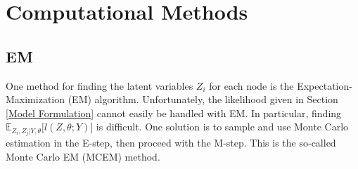 \documentclass{article}
\begin{document}


\section{Computational Methods} \label{Computational Methods}

\subsection{EM}

One method for finding the latent variables $Z_i$ for each node is the Expectation-Maximization (EM) algorithm. Unfortunately, the likelihood given in Section \ref{Model Formulation} cannot easily be handled with EM. In particular, finding $\mathbb{E}_{Z_i, Z_j | Y, \theta}\Big[l(Z, \theta ; Y)\Big]$ is difficult. One solution is to sample and use Monte Carlo estimation in the E-step, then proceed with the M-step. This is the so-called Monte Carlo EM (MCEM) method.
\end{document}
